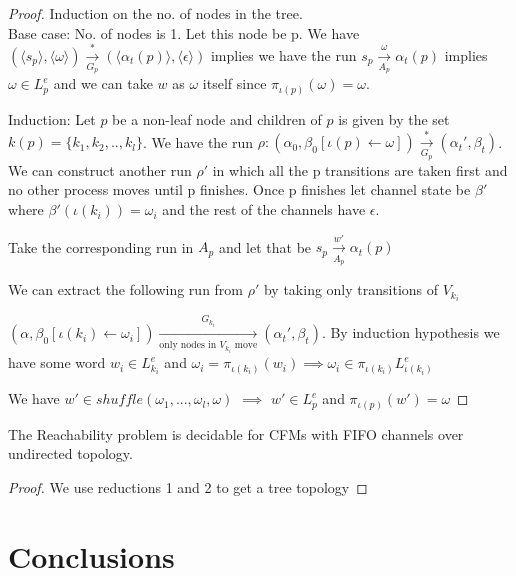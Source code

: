 \documentclass[a4paper,UKenglish,cleveref, autoref, thm-restate]{lipics-v2019}
\begin{document}
\begin{proof}
Induction on the no. of nodes in the tree. \\
Base case: No. of nodes is 1. Let this node be p. We have $(\langle s_p \rangle, \langle \omega \rangle ) \xrightarrow[G_p]{*} (\langle \alpha_t(p) \rangle, \langle \epsilon \rangle)$ implies we have the run $s_p \xrightarrow[A_p]{\omega } \alpha_t(p)$ implies $\omega \in L_p^e$ and we can take $w$ as $\omega$ itself since $\pi_{\iota(p)}(\omega) = \omega$. 

Induction: Let $p$ be a non-leaf node and children of $p$ is given by the set $k(p) = \{k_1, k_2, .., k_l\}$. We have the run $\rho: (\alpha_0, \beta_0[\iota(p) \leftarrow \omega]) \xrightarrow[G_p]{*} (\alpha_t', \beta_t)$. 
We can construct another run $\rho'$ in which all the p transitions are taken first and no other process moves until p finishes. Once p finishes let channel state be $\beta'$ 
where $\beta'(\iota(k_i)) = \omega_i$ and the rest of the channels have $\epsilon$. 

Take the corresponding run in $A_p$ and let that be $s_p \xrightarrow[A_p]{w'} \alpha_t(p)$

We can extract the following run from $\rho'$ by taking only transitions of $V_{k_i}$ 

$(\alpha, \beta_0[\iota(k_i) \leftarrow \omega_i]) \xrightarrow[\text{only nodes in $V_{k_i}$ move}]{G_{k_i}} (\alpha_t', \beta_t)$. By induction hypothesis we have some word $w_i \in L_{k_i}^e$ and $\omega_i = \pi_{\iota(k_i)}(w_i) \implies \omega_i \in \pi_{\iota(k_i)}L_{\iota(k_i)}^e$

We have $w' \in shuffle(\omega_1, ..., \omega_l, \omega)$ 
$\implies$ $w' \in L_p^e$ and $\pi_{\iota(p)}(w') = \omega$


\end{proof}
    

   
\begin{theorem}\label{testenv-theorem}
    The Reachability problem is decidable for CFMs with FIFO channels over undirected topology. 
   \end{theorem}

   
\begin{proof}
    We use reductions 1 and 2 to get a tree topology
    
   \end{proof}

\section{Conclusions}
\end{document}
